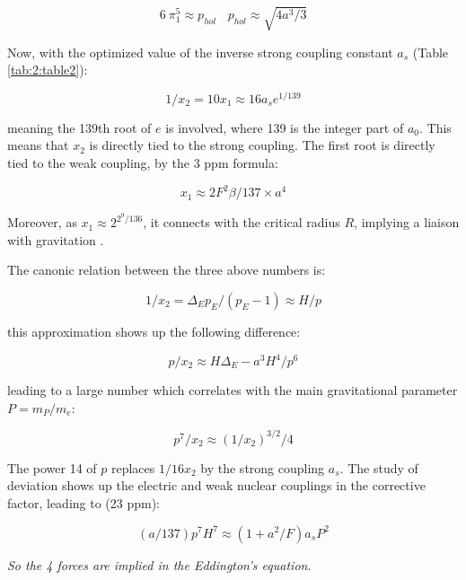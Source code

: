 \documentclass[a4paper,9pt]{article}
\begin{document}
\begin{equation}
6~\pi_1^5 \approx p_{hol}   ~~~~    p_{hol} \approx \sqrt{4a^3/3} 
\end{equation}

Now, with the optimized value of the inverse strong coupling constant $a_s$ (Table \ref{tab:2:table2}):

\begin{equation}
 1/x_2 = 10 x_1 \approx 16 a_s e^{1/139}     
\end{equation}

meaning the 139th root of $e$ is involved, where 139 is the integer part of $a_0$. This means that $x_2$ is directly tied to the strong coupling. The first root is directly tied to the weak coupling, by the 3 ppm formula:

\begin{equation}
  x_1 \approx 2F^2 \beta /137\times a^4    
\end{equation}

Moreover, as $x_1 \approx 2^{2^9/136}$, it connects with the critical radius $R$, implying a liaison with gravitation \cite{Sanchez}. 
  
  
The canonic relation between the three above numbers is:

\begin{equation}
  1/x_2  = \Delta_E p_E /(p_E - 1) \approx H/p   
\end{equation}

this approximation shows up the following difference:

\begin{equation}
  p/x_2 \approx H \Delta_E - a^3H^4/p^6   
\end{equation}

leading to a large number which correlates with the main gravitational parameter $P = m_P/m_e$:

\begin{equation}
  p^7/x_2 \approx (1/x_2)^{3/2}/4   
\end{equation}

The power 14 of $p$ replaces $1/16x_2$ by the strong coupling $a_s$.  The study of deviation shows up the electric and weak nuclear couplings in the corrective factor, leading to (23 ppm):

\begin{equation}
(a/137) p^{7} H^{7} \approx (1+a^2/F)a_s P^2   
\end{equation}

\textit{So the 4 forces are implied in the Eddington's equation}.
\end{document}
